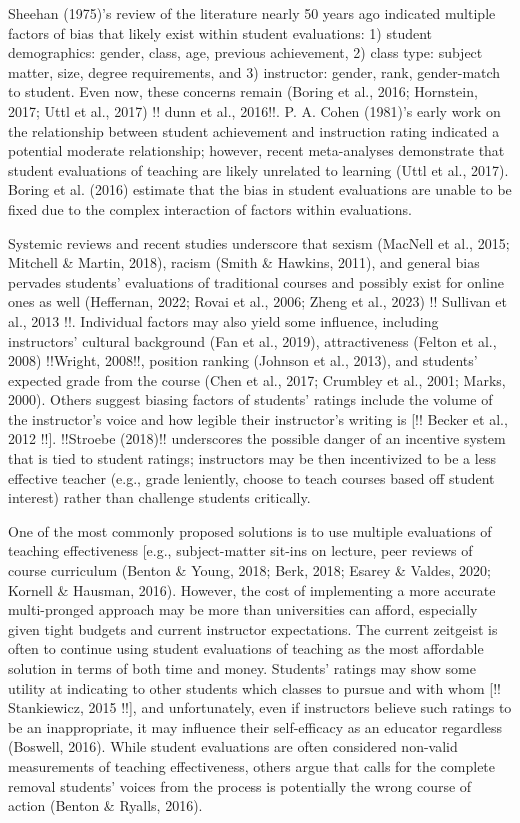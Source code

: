 \documentclass[
  man]{apa7}
\begin{document}
Sheehan (1975)'s review of the literature nearly 50 years ago indicated
multiple factors of bias that likely exist within student evaluations:
1) student demographics: gender, class, age, previous achievement, 2)
class type: subject matter, size, degree requirements, and 3)
instructor: gender, rank, gender-match to student. Even now, these
concerns remain (Boring et al., 2016; Hornstein, 2017; Uttl et al., 2017) !! dunn et al.,
2016!!. P. A. Cohen (1981)'s early work on the relationship between student
achievement and instruction rating indicated a potential moderate
relationship; however, recent meta-analyses demonstrate that student
evaluations of teaching are likely unrelated to learning (Uttl et al., 2017).
Boring et al. (2016) estimate that the bias in student evaluations are unable to
be fixed due to the complex interaction of factors within evaluations.

Systemic reviews and recent studies underscore that sexism
(MacNell et al., 2015; Mitchell \& Martin, 2018), racism (Smith \& Hawkins, 2011), and general bias
pervades students' evaluations of traditional courses and possibly exist
for online ones as well (Heffernan, 2022; Rovai et al., 2006; Zheng et al., 2023) !!
Sullivan et al., 2013 !!. Individual factors may also yield some
influence, including instructors' cultural background (Fan et al., 2019),
attractiveness (Felton et al., 2008) !!Wright, 2008!!, position ranking
(Johnson et al., 2013), and students' expected grade from the course (Chen et al., 2017; Crumbley et al., 2001; Marks, 2000). Others suggest biasing factors of students'
ratings include the volume of the instructor's voice and how legible
their instructor's writing is {[}!! Becker et al., 2012 !!{]}. !!Stroebe
(2018)!! underscores the possible danger of an incentive system that is
tied to student ratings; instructors may be then incentivized to be a
less effective teacher (e.g., grade leniently, choose to teach courses
based off student interest) rather than challenge students critically.

One of the most commonly proposed solutions is to use multiple
evaluations of teaching effectiveness {[}e.g., subject-matter sit-ins on
lecture, peer reviews of course curriculum (Benton \& Young, 2018; Berk, 2018; Esarey \& Valdes, 2020; Kornell \& Hausman, 2016). However, the cost of implementing a more
accurate multi-pronged approach may be more than universities can
afford, especially given tight budgets and current instructor
expectations. The current zeitgeist is often to continue using student
evaluations of teaching as the most affordable solution in terms of both
time and money. Students' ratings may show some utility at indicating to
other students which classes to pursue and with whom {[}!! Stankiewicz,
2015 !!{]}, and unfortunately, even if instructors believe such ratings to
be an inappropriate, it may influence their self-efficacy as an educator
regardless (Boswell, 2016). While student evaluations are often
considered non-valid measurements of teaching effectiveness, others
argue that calls for the complete removal students' voices from the
process is potentially the wrong course of action (Benton \& Ryalls, 2016).
\end{document}
